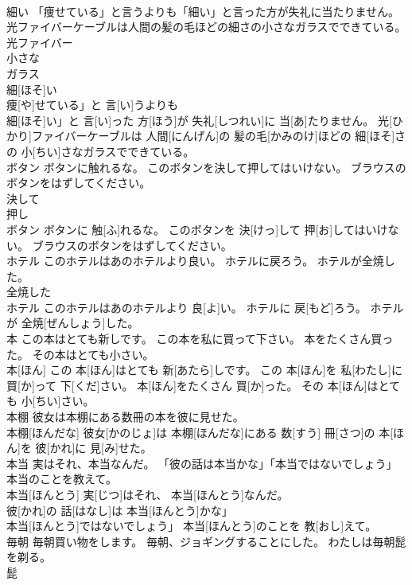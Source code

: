 \documentclass[8pt]{extreport}
\begin{document}
\begin{CJK}{UTF8}{min}
\\	細い 「痩せている」と言うよりも「細い」と言った方が失礼に当たりません。 光ファイバーケーブルは人間の髪の毛ほどの細さの小さなガラスでできている。	
\\	光ファイバー 
\\	小さな 
\\	ガラス 
\\	細[ほそ]い 
\\	痩[や]せている」と 言[い]うよりも
\\	細[ほそ]い」と 言[い]った 方[ほう]が 失礼[しつれい]に 当[あ]たりません。 光[ひかり]ファイバーケーブルは 人間[にんげん]の 髪の毛[かみのけ]ほどの 細[ほそ]さの 小[ちい]さなガラスでできている。
\\	ボタン ボタンに触れるな。 このボタンを決して押してはいけない。 ブラウスのボタンをはずしてください。	
\\	決して 
\\	押し 
\\	ボタン ボタンに 触[ふ]れるな。 このボタンを 決[けっ]して 押[お]してはいけない。 ブラウスのボタンをはずしてください。
\\	ホテル このホテルはあのホテルより良い。 ホテルに戻ろう。 ホテルが全焼した。	
\\	全焼した 
\\	ホテル このホテルはあのホテルより 良[よ]い。 ホテルに 戻[もど]ろう。 ホテルが 全焼[ぜんしょう]した。
\\	本 この本はとても新しです。 この本を私に買って下さい。 本をたくさん買った。 その本はとても小さい。	
\\	本[ほん] この 本[ほん]はとても 新[あたら]しです。 この 本[ほん]を 私[わたし]に 買[か]って 下[くだ]さい。 本[ほん]をたくさん 買[か]った。 その 本[ほん]はとても 小[ちい]さい。
\\	本棚 彼女は本棚にある数冊の本を彼に見せた。	
\\	本棚[ほんだな] 彼女[かのじょ]は 本棚[ほんだな]にある 数[すう] 冊[さつ]の 本[ほん]を 彼[かれ]に 見[み]せた。
\\	本当 実はそれ、本当なんだ。 「彼の話は本当かな」「本当ではないでしょう」 本当のことを教えて。	
\\	本当[ほんとう] 実[じつ]はそれ、 本当[ほんとう]なんだ。 
\\	彼[かれ]の 話[はなし]は 本当[ほんとう]かな」
\\	本当[ほんとう]ではないでしょう」 本当[ほんとう]のことを 教[おし]えて。
\\	毎朝 毎朝買い物をします。 毎朝、ジョギングすることにした。 わたしは毎朝髭を剃る。	
\\	髭 

\end{CJK}
\end{document}
